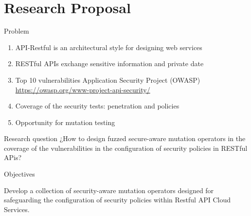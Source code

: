 \documentclass[10pt]{beamer}
\theoremstyle{remark}
\theoremstyle{definition}
\begin{document}
\section{Research Proposal}

\begin{frame}{Problem}

\begin{enumerate}
    \item API-Restful is an architectural style for designing web services
    \item RESTful APIs exchange sensitive information and private date
    \item Top 10 vulnerabilities Application Security Project (OWASP) \url{https://owasp.org/www-project-api-security/}
    \item Coverage of the security tests: penetration and policies
    \item Opportunity for mutation testing
\end{enumerate}
\end{frame}


\begin{frame}{Research question}
¿How to design fuzzed secure-aware mutation operators in the coverage of the vulnerabilities in the configuration of security policies in RESTful APis?
\end{frame}



\begin{frame}{Objectives}

Develop a collection of security-aware mutation operators designed for safeguarding the configuration of security policies within Restful API Cloud Services.

\end{frame}
\end{document}
